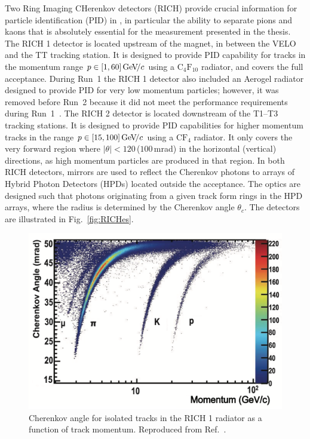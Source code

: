 Two Ring Imaging CHerenkov detectors (RICH) provide crucial information for particle identification (PID) in \lhcb, in particular the ability to separate pions and kaons that is absolutely essential for the measurement presented in the thesis. The RICH 1 detector is located upstream of the magnet, in between the VELO and the TT tracking station. It is designed to provide PID capability for tracks in the momentum range $p\in[1, 60]\text{\,Ge\kern -0.1em V\!/}c$ using a $\mathrm{C_4F_{10}}$ radiator, and covers the full \lhcb acceptance. During Run~1 the RICH 1 detector also included an Aerogel radiator designed to provide PID for very low momentum particles; however, it was removed before Run~2 because it did not meet the performance requirements during Run~1~\cite{RICH-Performance,RICH-Performance-2}. The RICH 2 detector is located downstream of the T1--T3 tracking stations. It is designed to provide PID capabilities for higher momentum tracks in the range $p\in[15, 100]\text{\,Ge\kern -0.1em V\!/}c$ using a $\mathrm{CF_4}$ radiator. It only covers the very forward region where $|\theta| < 120$\,\mrad ($100$\,mrad) in the horizontal (vertical) directions, as high momentum particles are produced in that region. In both RICH detectors, mirrors are used to reflect the Cherenkov photons to arrays of Hybrid Photon Detectors (HPDs) located outside the \lhcb acceptance. The optics are designed such that photons originating from a given track form rings in the HPD arrays, where the radius is determined by the Cherenkov angle $\theta_c$. The detectors are illustrated in Fig.~\ref{fig:RICHes}.

\begin{figure}[tb]
    \centering
    \includegraphics[width=0.55\columnwidth]{figures/detector/RICH_single_track.png}
    \caption{Cherenkov angle for isolated tracks in the RICH 1 radiator as a function of track momentum. Reproduced from Ref.~\cite{RICH-Performance}.}
    \label{fig:RICH_tracks}
\end{figure}

